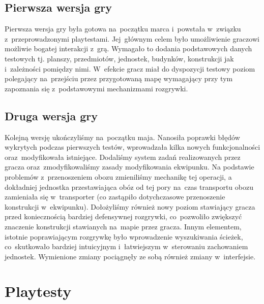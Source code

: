 \documentclass[licencjacka]{pracamgr}
\begin{document}
    \section{Pierwsza wersja gry}
    Pierwsza wersja gry była gotowa na~początku marca i~powstała w~związku z~przeprowadzonymi playtestami. Jej~głównym
    celem było umożliwienie graczowi możliwie bogatej interakcji z~grą. Wymagało to dodania podstawowych
    danych testowych tj. planszy, przedmiotów, jednostek, budynków, konstrukcji jak i~zależności pomiędzy nimi.
    W~efekcie gracz miał do dyspozycji testowy poziom polegający na~przejściu przez przygotowaną mapę wymagający
    przy tym zapoznania się z~podstawowymi mechanizmami rozgrywki.

    \section{Druga wersja gry}
    Kolejną wersję ukończyliśmy na~początku maja. Nanosiła poprawki błędów wykrytych podczas pierwszych testów, wprowadzała kilka nowych
    funkcjonalności oraz~modyfikowała istniejące. Dodaliśmy system zadań realizowanych przez gracza oraz~zmodyfikowaliśmy zasady modyfikowania
    ekwipunku. Na podstawie problemów z~przenoszeniem obozu zmieniliśmy mechanikę tej operacji, a dokładniej jednostka przestawiająca
    obóz od tej pory na~czas transportu obozu zamieniała się w~transporter (co zastąpiło dotychczasowe przenoszenie konstrukcji w~ekwipunku).
    Dołożyliśmy również nowy poziom stawiający gracza przed koniecznością bardziej defensywnej rozgrywki,
    co~pozwoliło zwiększyć znaczenie konstrukcji stawianych na~mapie przez gracza. Innym elementem, istotnie poprawiającym
    rozgrywkę było wprowadzenie wyszukiwania ścieżek, co~skutkowało bardziej intuicyjnym i~łatwiejszym w~sterowaniu
    zachowaniem jednostek. Wymienione zmiany pociągnęły ze sobą również zmiany w~interfejsie.

\chapter{Playtesty}
\end{document}
